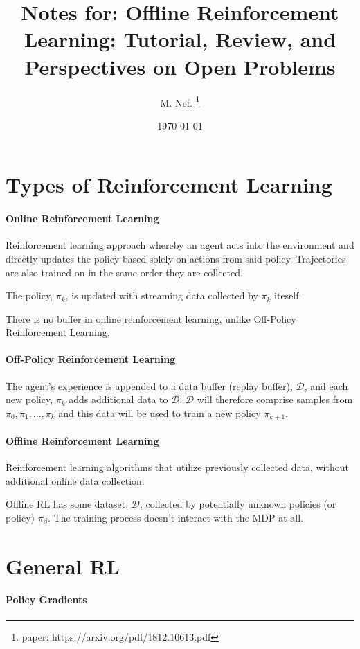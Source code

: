 \documentclass{article}
\title{Notes for: Offline Reinforcement Learning: Tutorial, Review, and Perspectives on Open Problems}
\author{M. Nef. \thanks{paper: https://arxiv.org/pdf/1812.10613.pdf}}
\date{\today}
\begin{document}
\maketitle

\section{Types of Reinforcement Learning}
\paragraph{Online Reinforcement Learning}
Reinforcement learning approach whereby an agent acts into the environment and directly updates the policy based solely on actions from said policy. Trajectories are also trained on in the same order they are collected.

The policy, \(\pi_k\), is updated with streaming data collected by \(\pi_k\) iteself.

There is no buffer in online reinforcement learning, unlike Off-Policy Reinforcement Learning.

\paragraph{Off-Policy Reinforcement Learning} The agent's experience is appended to a data buffer (replay buffer), \(\mathcal{D}\), and each new policy, \(\pi_k\) adds additional data to \(\mathcal{D}\).
\(\mathcal{D}\) will therefore comprise samples from \( \pi_0 , \pi_1 , \dots, \pi_k\) and this data will be used to train a new policy \(\pi_{k+1}\).

\paragraph{Offline Reinforcement Learning}
Reinforcement learning algorithms that utilize previously collected data, without additional online data collection.

Offline RL has some dataset, \(\mathcal{D}\), collected by potentially unknown policies (or policy) \(\pi_\beta\).
The training process doesn't interact with the MDP at all.

\section{General RL}
\pagebreak
\paragraph{Policy Gradients}
\end{document}
